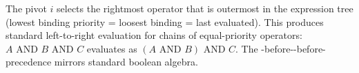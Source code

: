 The pivot $i$ selects the rightmost operator that is outermost in the expression tree (lowest binding priority = loosest binding = last evaluated). This produces standard left-to-right evaluation for chains of equal-priority operators: $A \text{ AND } B \text{ AND } C$ evaluates as $(A \text{ AND } B) \text{ AND } C$. The -before--before- precedence mirrors standard boolean algebra.
